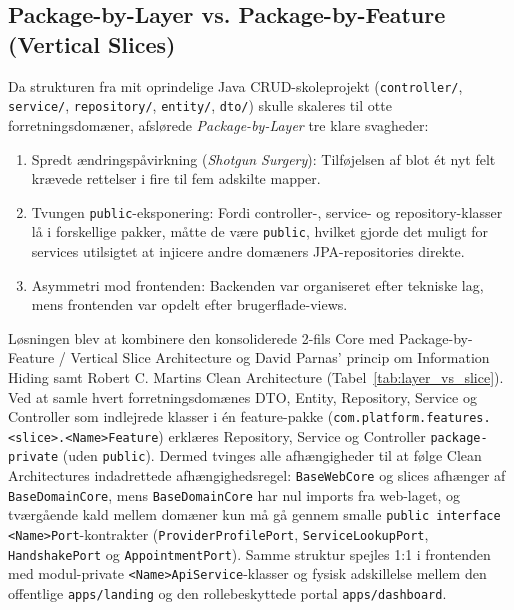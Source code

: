 \documentclass[11pt,a4paper]{article}
\begin{document}
\subsection{Package-by-Layer vs. Package-by-Feature (Vertical Slices)}
Da strukturen fra mit oprindelige Java CRUD-skoleprojekt (\texttt{controller/}, \texttt{service/}, \texttt{repository/}, \texttt{entity/}, \texttt{dto/}) skulle skaleres til otte forretningsdomæner, afslørede \textit{Package-by-Layer} tre klare svagheder:
\begin{enumerate}[noitemsep]
    \item Spredt ændringspåvirkning (\textit{Shotgun Surgery}): Tilføjelsen af blot ét nyt felt krævede rettelser i fire til fem adskilte mapper.
    \item Tvungen \texttt{public}-eksponering: Fordi controller-, service- og repository-klasser lå i forskellige pakker, måtte de være \texttt{public}, hvilket gjorde det muligt for services utilsigtet at injicere andre domæners JPA-repositories direkte.
    \item Asymmetri mod frontenden: Backenden var organiseret efter tekniske lag, mens frontenden var opdelt efter brugerflade-views.
\end{enumerate}

Løsningen blev at kombinere den konsoliderede 2-fils Core med Package-by-Feature / Vertical Slice Architecture \cite{bogard2018} og David Parnas' princip om Information Hiding \cite{parnas1972} samt Robert C. Martins Clean Architecture \cite{martin2017} (Tabel~\ref{tab:layer_vs_slice}). Ved at samle hvert forretningsdomænes DTO, Entity, Repository, Service og Controller som indlejrede klasser i én feature-pakke (\texttt{com.platform.features.<slice>.<Name>Feature}) erklæres Repository, Service og Controller \texttt{package-private} (uden \texttt{public}). Dermed tvinges alle afhængigheder til at følge Clean Architectures indadrettede afhængighedsregel: \texttt{BaseWebCore} og slices afhænger af \texttt{BaseDomainCore}, mens \texttt{BaseDomainCore} har nul imports fra web-laget, og tværgående kald mellem domæner kun må gå gennem smalle \texttt{public interface <Name>Port}-kontrakter (\texttt{ProviderProfilePort}, \texttt{ServiceLookupPort}, \texttt{HandshakePort} og \texttt{AppointmentPort}). Samme struktur spejles 1:1 i frontenden med modul-private \texttt{<Name>ApiService}-klasser og fysisk adskillelse mellem den offentlige \texttt{apps/landing} og den rollebeskyttede portal \texttt{apps/dashboard}.
\end{document}
